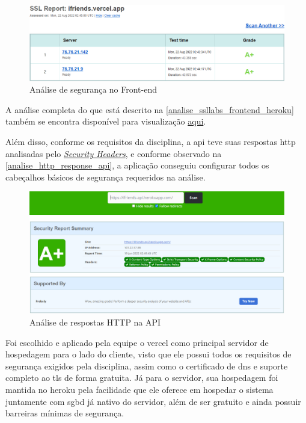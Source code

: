 \begin{figure}[htb]
\centering
\caption{\label{analise_ssllabs_frontend_heroku} Análise de segurança no Front-end}
\includegraphics[width=1\textwidth]{anexos/Imagens_Seguranca/analise_ssllabs_frontend_heroku.png}
\end{figure}
\FloatBarrier

A análise completa do que está descrito na  \autoref{analise_ssllabs_frontend_heroku} também se encontra disponível para visualização \href{https://www.ssllabs.com/ssltest/analyze.html?d=ifriends.vercel.app}{aqui}.

Além disso, conforme os requisitos da disciplina, a \acs{api} teve suas respostas \acs{http} analisadas pelo \href{https://securityheaders.io}{\textit{Security Headers}}, e conforme observado na \autoref{analise_http_response_api}, a aplicação conseguiu configurar todos os cabeçalhos básicos de segurança requeridos na análise.

\begin{figure}[htb]
\centering
\caption{\label{analise_http_response_api} Análise de respostas HTTP na API}
\includegraphics[width=1\textwidth]{anexos/Imagens_Seguranca/analise_http_response_api.png}
\end{figure}
\FloatBarrier

Foi escolhido e aplicado pela equipe o \gls{vercel} como principal servidor de hospedagem para o lado do cliente, visto que ele possui todos os requisitos de segurança exigidos pela disciplina, assim como o certificado de \acs{dns} e suporte completo ao \acs{tls} de forma gratuita. Já para o servidor, sua hospedagem foi mantida no \gls{heroku} pela facilidade que ele oferece em hospedar o sistema juntamente com \acs{sgbd} já nativo do servidor, além de ser gratuito e ainda possuir barreiras mínimas de segurança.

